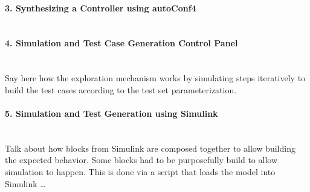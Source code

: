 \paragraph{3. Synthesizing a Controller using \textsf{autoConf4}\\\\}

\paragraph{4. Simulation and Test Case Generation Control Panel\\\\}

Say here how the exploration mechanism works by simulating steps iteratively to
build the test cases according to the test set parameterization.

\paragraph{5. Simulation and Test Generation using Simulink\\\\}

Talk about how blocks from Simulink are composed together to allow building the
expected behavior. Some blocks had to be purposefully build to allow simulation
to happen. This is done via a script that loads the model into Simulink \ldots
